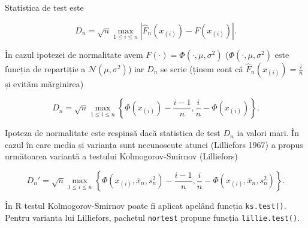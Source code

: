 \documentclass[]{article}
\begin{document}
Statistica de test este

\[
  D_n = \sqrt{n}\max_{1\leq i\leq n}\left|\hat{F}_n(x_{(i)}) - F(x_{(i)})\right|.
\]

În cazul ipotezei de normalitate avem
\(F(\cdot) = \Phi(\cdot, \mu, \sigma^2)\)
(\(\Phi(\cdot, \mu, \sigma^2)\) este funcția de repartiție a
\(\mathcal{N}(\mu, \sigma^2)\)) iar \(D_n\) se scrie (ținem cont că
\(\hat{F}_n(x_{(i)}) = \frac{i}{n}\) și evităm mărginirea)

\[
  D_n = \sqrt{n}\max_{1\leq i\leq n}\left\{\Phi(x_{(i)})-\frac{i-1}{n}, \frac{i}{n} - \Phi(x_{(i)})\right\}.
\]

Ipoteza de normalitate este respinsă dacă statistica de test \(D_n\) ia
valori mari. În cazul în care media și varianța sunt necunoscute atunci
(Lilliefors 1967) a propus următoarea variantă a testului
Kolmogorov-Smirnov (Lilliefors)

\[
  D_n' = \sqrt{n}\max_{1\leq i\leq n}\left\{\Phi(x_{(i)}, \bar{x}_n, s_n^2)-\frac{i-1}{n}, \frac{i}{n} - \Phi(x_{(i)}, \bar{x}_n, s_n^2)\right\}.
\]

În R testul Kolmogorov-Smirnov poate fi aplicat apelând funcția
\texttt{ks.test()}. Pentru varianta lui Lilliefors, pachetul
\texttt{nortest} propune funcția \texttt{lillie.test()}.
\end{document}
